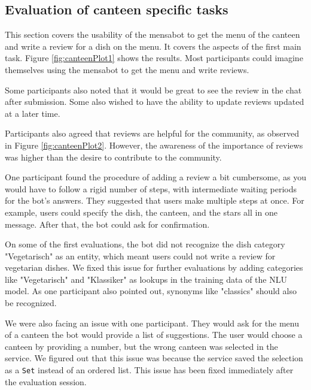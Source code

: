 \subsection{Evaluation of canteen specific tasks}  
This section covers the usability of the mensabot to get the menu of the canteen and write a review for a dish on the menu. It covers the aspects of the first main task. Figure \ref{fig:canteenPlot1} shows the results. Most participants could imagine themselves using the mensabot to get the menu and write reviews.
 
Some participants also noted that it would be great to see the review in the chat after submission. Some also wished to have the ability to update reviews updated at a later time.

Participants also agreed that reviews are helpful for the community, as observed in Figure \ref{fig:canteenPlot2}. 
However, the awareness of the importance of reviews was higher than the desire to contribute to the community. 

One participant found the procedure of adding a review a bit cumbersome, as you would have to follow a rigid number of steps, with intermediate waiting periods for the bot's answers. They suggested that users make multiple steps at once. For example, users could specify the dish, the canteen, and the stars all in one message. After that, the bot could ask for confirmation.

On some of the first evaluations, the bot did not recognize the dish category "Vegetarisch" as an entity, which meant users could not write a review for vegetarian dishes. We fixed this issue for further evaluations by adding categories like "Vegetarisch" and "Klassiker" as lookups in the training data of the NLU model. 
As one participant also pointed out, synonyms like "classics" should also be recognized.

We were also facing an issue with one participant. They would ask for the menu of a canteen the bot would provide a list of suggestions. The user would choose a  canteen by providing a number, but the wrong canteen was selected in the service. We figured out that this issue was because the service saved the selection as a \texttt{Set} instead of an ordered list.
This issue has been fixed immediately after the evaluation session.

